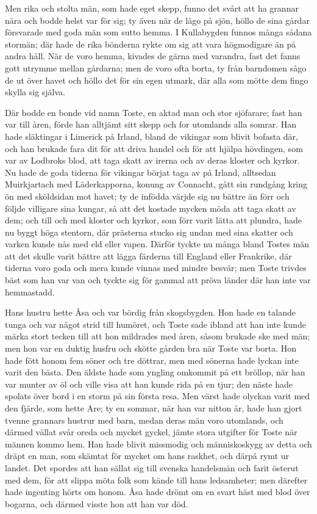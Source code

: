 \initial Men rika och stolta män, som hade eget skepp, funno det svårt att ha grannar nära och bodde helst var för sig; ty även när de lågo på sjön, höllo de sina gårdar försvarade med goda män som sutto hemma. I Kullabygden funnos många sådana stormän; där hade de rika bönderna rykte om sig att vara högmodigare än på andra håll. När de voro hemma, kivades de gärna med varandra, fast det fanns gott utrymme mellan gårdarna; men de voro ofta borta, ty från barndomen sågo de ut över havet och höllo det för sin egen utmark, där alla som mötte dem fingo skylla sig själva.

\initial Där bodde en bonde vid namn Toste, en aktad man och stor sjöfarare; fast han var till åren, förde han alltjämt sitt skepp och for utomlands alla somrar. Han hade släktingar i Limerick på Irland, bland de vikingar som blivit bofasta där, och han brukade fara dit för att driva handel och för att hjälpa hövdingen, som var av Lodbroks blod, att taga skatt av irerna och av deras kloster och kyrkor. Nu hade de goda tiderna för vikingar börjat taga av på Irland, alltsedan Muirkjartach med Läderkapporna, konung av Connacht, gått sin rundgång kring ön med sköldsidan mot havet; ty de infödda värjde sig nu bättre än förr och följde villigare sina kungar, så att det kostade mycken möda att taga skatt av dem; och till och med kloster och kyrkor, som förr varit lätta att plundra, hade nu byggt höga stentorn, där prästerna stucko sig undan med sina skatter och varken kunde nås med eld eller vapen. Därför tyckte nu många bland Tostes män att det skulle varit bättre att lägga färderna till England eller Frankrike, där tiderna voro goda och mera kunde vinnas med mindre besvär; men Toste trivdes bäst som han var van och tyckte sig för gammal att pröva länder där han inte var hemmastadd.

\initial Hans hustru hette Åsa och var bördig från skogsbygden. Hon hade en talande tunga och var något strid till humöret, och Toste sade ibland att han inte kunde märka stort tecken till att hon mildrades med åren, såsom brukade ske med män; men hon var en duktig husfru och skötte gården bra när Toste var borta. Hon hade fött honom fem söner och tre döttrar, men med sönerna hade lyckan inte varit den bästa. Den äldste hade som yngling omkommit på ett bröllop, när han var munter av öl och ville visa att han kunde rida på en tjur; den näste hade spolats över bord i en storm på sin första resa. Men värst hade olyckan varit med den fjärde, som hette Are; ty en sommar, när han var nitton år, hade han gjort tvenne grannars hustrur med barn, medan deras män voro utomlands, och därmed vållat svår oreda och mycket gyckel, jämte stora utgifter för Toste när männen kommo hem. Han hade blivit missmodig och människoskygg av detta och dräpt en man, som skämtat för mycket om hans raskhet, och därpå rymt ur landet. Det spordes att han sällat sig till svenska handelsmän och farit österut med dem, för att slippa möta folk som kände till hans ledsamheter; men därefter hade ingenting hörts om honom. Åsa hade drömt om en svart häst med blod över bogarna, och därmed visste hon att han var död.

